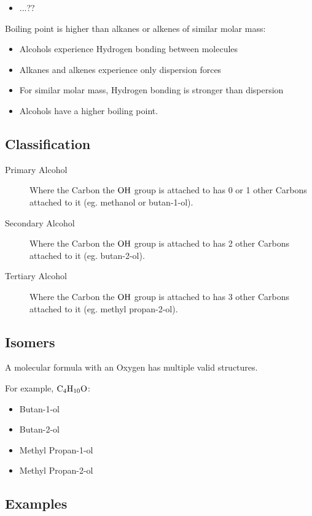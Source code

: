 \documentclass[a4paper,11pt]{article}
\begin{document}
\begin{itemize}
\item ...??
\end{itemize}

Boiling point is higher than alkanes or alkenes of similar molar mass:

\begin{itemize}
\item Alcohols experience Hydrogen bonding between molecules
\item Alkanes and alkenes experience only dispersion forces
\item For similar molar mass, Hydrogen bonding is stronger than dispersion
\item Alcohols have a higher boiling point.
\end{itemize}


\subsection{Classification}

\begin{description}
\item [Primary Alcohol] Where the Carbon the $\ce{OH}$ group is attached to
	has 0 or 1 other Carbons attached to it (eg. methanol or butan-1-ol).
\item [Secondary Alcohol] Where the Carbon the $\ce{OH}$ group is attached to
	has 2 other Carbons attached to it (eg. butan-2-ol).
\item [Tertiary Alcohol] Where the Carbon the $\ce{OH}$ group is attached to
	has 3 other Carbons attached to it (eg. methyl propan-2-ol).
\end{description}


\subsection{Isomers}

A molecular formula with an Oxygen has multiple valid structures.

For example, $\ce{C4H10O}$:

\begin{itemize}
\item Butan-1-ol
\item Butan-2-ol
\item Methyl Propan-1-ol
\item Methyl Propan-2-ol
\end{itemize}


\subsection{Examples}
\end{document}
